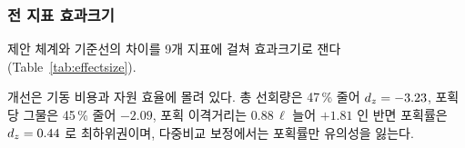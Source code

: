 \subsubsection{전 지표 효과크기}
\label{sec:res_effectsize}

제안 체계와 기준선의 차이를 9개 지표에 걸쳐 효과크기로 잰다(Table~\ref{tab:effectsize}).




개선은 기동 비용과 자원 효율에 몰려 있다. 총 선회량은 47\,\% 줄어 $d_z = -3.23$, 포획당
그물은 45\,\% 줄어 $-2.09$, 포획 이격거리는 $0.88\,\ell$ 늘어 $+1.81$ 인 반면 포획률은
$d_z = 0.44$ 로 최하위권이며, 다중비교 보정에서는 포획률만 유의성을 잃는다.
